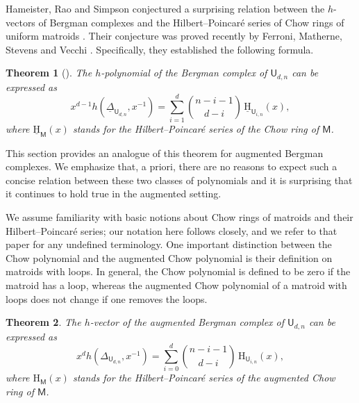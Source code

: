 \documentclass[11pt]{amsart}
\theoremstyle{theorems}
\newtheorem{theorem}{Theorem}[section]
\theoremstyle{definition}
\newcommand{\M}{{\mathsf{M}}}
\newcommand{\U}{{\mathsf{U}}}
\newcommand{\uH}{\underline{\mathrm{H}}}
\newcommand{\uDelta}{\underline{\Delta}}
\begin{document}
Hameister, Rao and Simpson conjectured a surprising relation between 
the $h$-vectors of Bergman complexes and the Hilbert--Poincar\'e 
series of Chow rings of uniform matroids \cite[Conjecture~6.2]{HRS21}. 
Their conjecture was proved recently by Ferroni, Matherne, Stevens 
and Vecchi \cite[Corollary~3.17]{FMSV24}. Specifically, they 
established the following formula. 

\begin{theorem}[\cite{FMSV24}]\label{thm:hrs-identity}
The $h$-polynomial of the Bergman complex of $\U_{d,n}$ can be 
expressed as
%
\[ x^{d-1} h(\uDelta_{\U_{d,n}},x^{-1}) = \sum_{i=1}^d 
   \binom{n-i-1}{d-i} \, \uH_{\U_{i,n}}(x), \]
%
where $\uH_{\M}(x)$ stands for the Hilbert--Poincar\'e series of the 
Chow ring of $\M$.
\end{theorem}

This section provides an analogue of this theorem for augmented Bergman 
complexes. We emphasize that, a priori, there are no reasons to expect 
such a concise relation between these two classes of polynomials and it 
is surprising that it continues to hold true in the augmented setting.

We assume familiarity with basic notions about Chow rings of 
matroids and their Hilbert--Poincar\'e series; our notation here follows 
\cite{FMSV24} closely, and we refer to that paper for any undefined 
terminology. One important distinction between the Chow polynomial and 
the augmented Chow polynomial is their definition on matroids with loops. 
In general, the Chow polynomial is defined to be zero if the matroid has 
a loop, whereas the augmented Chow polynomial of a matroid with loops 
does not change if one removes the loops.


\begin{theorem}
The $h$-vector of the augmented Bergman complex of $\U_{d,n}$ can be 
expressed as
%
\[ x^{d} h(\Delta_{\U_{d,n}},x^{-1}) = \sum_{i=0}^d \binom{n-i-1}{d-i} \,
   \mathrm{H}_{\U_{i,n}}(x), \]
%
where $\mathrm{H}_{\M}(x)$ stands for the Hilbert--Poincar\'e series of the augmented 
Chow ring of $\M$.
\end{theorem}
\end{document}
